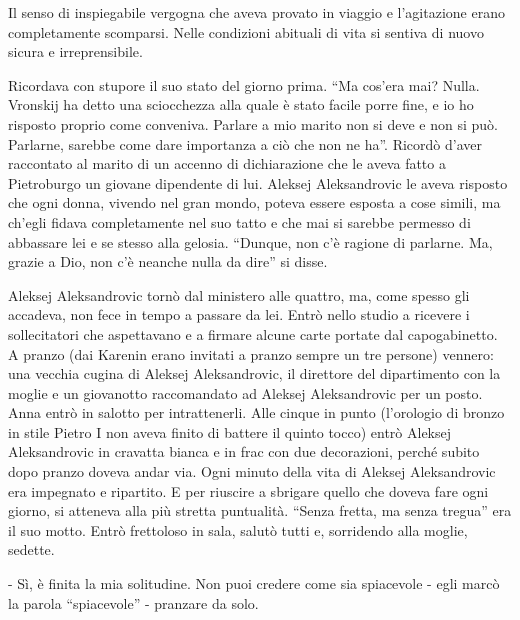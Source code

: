 Il senso di inspiegabile vergogna che aveva provato in viaggio e l'agitazione erano completamente scomparsi. Nelle condizioni abituali di vita si sentiva di nuovo sicura e irreprensibile. 

Ricordava con stupore il suo stato del giorno prima. ``Ma cos'era mai? Nulla. Vronskij ha detto una sciocchezza alla quale è stato facile porre fine, e io ho risposto proprio come conveniva. Parlare a mio marito non si deve e non si può. Parlarne, sarebbe come dare importanza a ciò che non ne ha''. Ricordò d'aver raccontato al marito di un accenno di dichiarazione che le aveva fatto a Pietroburgo un giovane dipendente di lui. Aleksej Aleksandrovic le aveva risposto che ogni donna, vivendo nel gran mondo, poteva essere esposta a cose simili, ma ch'egli fidava completamente nel suo tatto e che mai si sarebbe permesso di abbassare lei e se stesso alla gelosia. ``Dunque, non c'è ragione di parlarne. Ma, grazie a Dio, non c'è neanche nulla da dire'' si disse. 

Aleksej Aleksandrovic tornò dal ministero alle quattro, ma, come spesso gli accadeva, non fece in tempo a passare da lei. Entrò nello studio a ricevere i sollecitatori che aspettavano e a firmare alcune carte portate dal capogabinetto. A pranzo (dai Karenin erano invitati a pranzo sempre un tre persone) vennero: una vecchia cugina di Aleksej Aleksandrovic, il direttore del dipartimento con la moglie e un giovanotto raccomandato ad Aleksej Aleksandrovic per un posto. Anna entrò in salotto per intrattenerli. Alle cinque in punto (l'orologio di bronzo in stile Pietro I non aveva finito di battere il quinto tocco) entrò Aleksej Aleksandrovic in cravatta bianca e in frac con due decorazioni, perché subito dopo pranzo doveva andar via. Ogni minuto della vita di Aleksej Aleksandrovic era impegnato e ripartito. E per riuscire a sbrigare quello che doveva fare ogni giorno, si atteneva alla più stretta puntualità. ``Senza fretta, ma senza tregua'' era il suo motto. Entrò frettoloso in sala, salutò tutti e, sorridendo alla moglie, sedette. 

- Sì, è finita la mia solitudine. Non puoi credere come sia spiacevole - egli marcò la parola ``spiacevole'' - pranzare da solo. 

